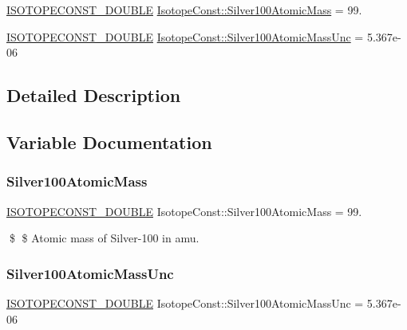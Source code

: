 \begin{DoxyCompactItemize}
\item 
\mbox{\hyperlink{group___isotope_const-_macros_ga8f45a7272ce02c0b4c65c44636ed719a}{I\+S\+O\+T\+O\+P\+E\+C\+O\+N\+S\+T\+\_\+\+D\+O\+U\+B\+LE}} \mbox{\hyperlink{group___isotope_const-_silver-_ag100_gab4318c7735cef666b6f957dd1b84c62e}{Isotope\+Const\+::\+Silver100\+Atomic\+Mass}} = 99.
\item 
\mbox{\hyperlink{group___isotope_const-_macros_ga8f45a7272ce02c0b4c65c44636ed719a}{I\+S\+O\+T\+O\+P\+E\+C\+O\+N\+S\+T\+\_\+\+D\+O\+U\+B\+LE}} \mbox{\hyperlink{group___isotope_const-_silver-_ag100_ga2ef79c9112e1041ec3fb3bfac4e21c05}{Isotope\+Const\+::\+Silver100\+Atomic\+Mass\+Unc}} = 5.\+367e-\/06
\end{DoxyCompactItemize}


\subsection{Detailed Description}


\subsection{Variable Documentation}
\mbox{\label{group___isotope_const-_silver-_ag100_gab4318c7735cef666b6f957dd1b84c62e}} 
\subsubsection{\texorpdfstring{Silver100\+Atomic\+Mass}{Silver100AtomicMass}}
{\footnotesize\ttfamily \mbox{\hyperlink{group___isotope_const-_macros_ga8f45a7272ce02c0b4c65c44636ed719a}{I\+S\+O\+T\+O\+P\+E\+C\+O\+N\+S\+T\+\_\+\+D\+O\+U\+B\+LE}} Isotope\+Const\+::\+Silver100\+Atomic\+Mass = 99.}

\$ \$ Atomic mass of Silver-\/100 in amu. \mbox{\label{group___isotope_const-_silver-_ag100_ga2ef79c9112e1041ec3fb3bfac4e21c05}} 
\subsubsection{\texorpdfstring{Silver100\+Atomic\+Mass\+Unc}{Silver100AtomicMassUnc}}
{\footnotesize\ttfamily \mbox{\hyperlink{group___isotope_const-_macros_ga8f45a7272ce02c0b4c65c44636ed719a}{I\+S\+O\+T\+O\+P\+E\+C\+O\+N\+S\+T\+\_\+\+D\+O\+U\+B\+LE}} Isotope\+Const\+::\+Silver100\+Atomic\+Mass\+Unc = 5.\+367e-\/06}


